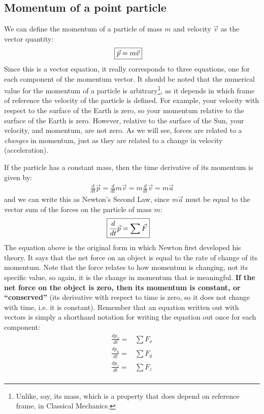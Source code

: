 \subsection{Momentum of a point particle}
We can define the momentum of a particle of mass $m$ and velocity $\vec v$ as the vector quantity:
\begin{align}
\Aboxed{\vec p = m\vec v}
\end{align}
Since this is a vector equation, it really corresponds to three equations, one for each component of the momentum vector. It should be noted that the numerical value for the momentum of a particle is arbitrary\footnote{Unlike, say, its mass, which is a property that does depend on reference frame, in Classical Mechanics.}, as it depends in which frame of reference the velocity of the particle is defined. For example, your velocity with respect to the surface of the Earth is zero, so your momentum relative to the surface of the Earth is zero. However, relative to the surface of the Sun, your velocity, and momentum, are not zero. As we will see, forces are related to a \textit{changes} in momentum, just as they are related to a change in velocity (acceleration). 

If the particle has a constant mass, then the time derivative of its momentum is given by:
\begin{align*}
\frac{d}{dt}\vec p = \frac{d}{dt}m\vec v = m\frac{d}{dt}\vec v=m\vec a
\end{align*}
and we can write this as Newton's Second Law, since $m\vec a$ must be equal to the vector sum of the forces on the particle of mass $m$:
\begin{align}
\Aboxed{\frac{d}{dt}\vec p = \sum \vec F}
\end{align}
The equation above is the original form in which Newton first developed his theory. It says that the net force on an object is equal to the rate of change of its momentum. Note that the force relates to how momentum is changing, not its specific value, so again, it is the change in momentum that is meaningful. \textbf{If the net force on the object is zero, then its momentum is constant, or ``conserved''} (its derivative with respect to time is zero, so it does not change with time, i.e. it is constant). Remember that an equation written out with vectors is simply a shorthand notation for writing the equation out once for each component:
\begin{align*}
\frac{dp_x}{dt} =& \sum F_x\\
\frac{dp_y}{dt} =& \sum F_y\\
\frac{dp_z}{dt} =& \sum F_z\\
\end{align*}

